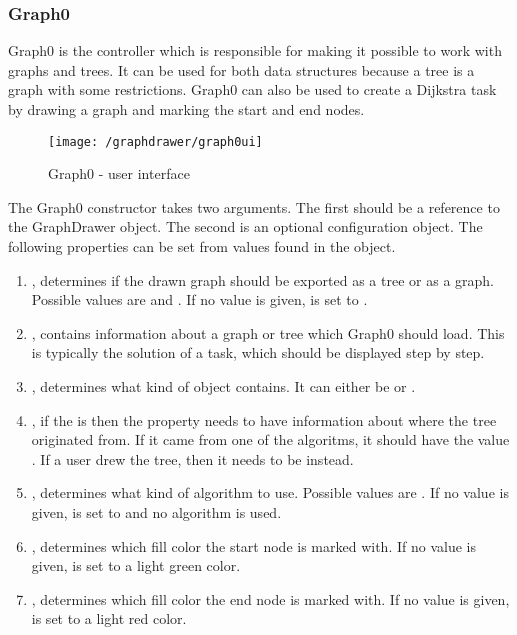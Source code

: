 \subsubsection{Graph0}
Graph0 is the controller which is responsible for making it possible to work with graphs and trees. It can be used for both data structures because a tree is a graph with some restrictions. Graph0 can also be used to create a Dijkstra task by drawing a graph and marking the start and end nodes. 
\begin{figure}[H]
    \centering
    \texttt{[image: /graphdrawer/graph0ui]}
    \caption{Graph0 - user interface}
    \label{fig:graphdrawerGraph0UserInterface}
\end{figure}
The Graph0 constructor takes two arguments. The first should be a reference to the GraphDrawer object. The second is an optional configuration object. The following properties can be set from values found in the object.
\begin{enumerate}
    \item {}, determines if the drawn graph should be exported as a tree or as a graph. Possible values are  and . If no value is given,  is set to .
    \item {}, contains information about a graph or tree which Graph0 should load. This is typically the solution of a task, which should be displayed step by step.
    \item {}, determines what kind of object  contains. It can either be  or .
    \item {}, if the  is  then the  property needs to have information about where the tree originated from. If it came from one of the algoritms, it should have the value . If a user drew the tree, then it needs to be  instead.
    \item {}, determines what kind of algorithm to use. Possible values are . If no value is given,  is set to  and no algorithm is used.
    \item {}, determines which fill color the start node is marked with. If no value is given,  is set to a light green color.
    \item {}, determines which fill color the end node is marked with. If no value is given,  is set to a light red color.
\end{enumerate}

